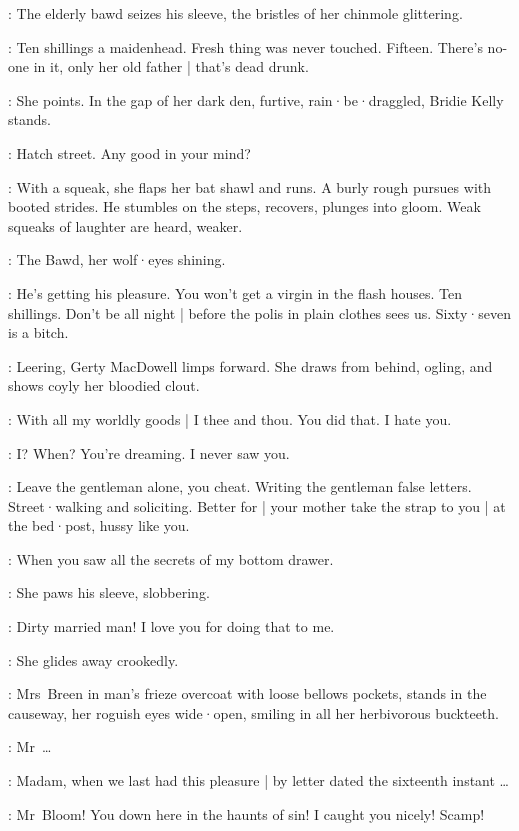 :
The elderly bawd seizes his sleeve,
the bristles of her chinmole glittering.

\Bawd:
Ten shillings a maidenhead.
Fresh thing was never touched.
Fifteen.
There's no-one in it,
only her old father |
that's dead drunk.

:
She points.
In the gap of her dark den,
furtive,
rain·be·draggled,
Bridie Kelly stands.

\Bridie:
Hatch street.
Any good in your mind?

:
With a squeak,
she flaps her bat shawl and runs.
A burly rough pursues with booted strides.
He stumbles on the steps,
recovers,
plunges into gloom.
Weak squeaks of laughter are heard,
weaker.

:
The Bawd,
her wolf·eyes shining.

\Bawd:
He's getting his pleasure.
You won't get a virgin in the flash houses.
Ten shillings.
Don't be all night |
before the polis in plain clothes sees us.
Sixty·seven is a bitch.

:
Leering,
Gerty MacDowell limps forward.
She draws from behind,
ogling,
and shows coyly her bloodied clout.

\Gerty:
With all my worldly goods |
I thee and thou.
You did that.
I hate you.

\Bloom:
I?
When?
You're dreaming.
I never saw you.

\Bawd:
Leave the gentleman alone,
you cheat.
Writing the gentleman false letters.
Street·walking and soliciting.
Better for |
your mother take the strap to you |
at the bed·post,
hussy like you.

\Gerty:
\sout{}
When you saw all the secrets of my bottom drawer.

:
She paws his sleeve,
slobbering.

\Gerty:
Dirty married man!
I love you for doing that to me.

:
She glides away crookedly.

:
Mrs~Breen in man's frieze overcoat with loose bellows pockets,
stands in the causeway,
her roguish eyes wide·open,
smiling in all her herbivorous buckteeth.

\MrsBreen:
Mr~\ldots
{}

\Bloom:
Madam,
when we last had this pleasure |
by letter dated the sixteenth instant \ldots

\MrsBreen:
Mr~Bloom!
You down here in the haunts of sin!
I caught you nicely!
Scamp!

